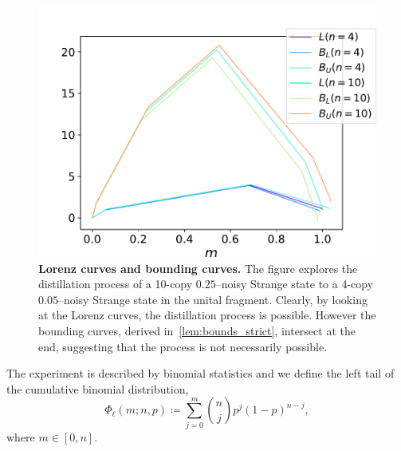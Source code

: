 \documentclass[pra,
aps,
twocolumn,
superscriptaddress,
groupedaddress,
nofootinbib,
reprint
]{revtex4-1}
\begin{document}
\begin{figure}[t]
    \centering
    \includegraphics[scale=0.4]{figs/lc_bounds.pdf}
    \caption{\textbf{Lorenz curves and bounding curves.} 
    The figure explores the distillation process of a 10-copy $0.25$--noisy Strange state to a 4-copy $0.05$--noisy Strange state in the unital fragment.
    Clearly, by looking at the Lorenz curves, the distillation process is possible.
    However the bounding curves, derived in~\cref{lem:bounds_strict}, intersect at the end, suggesting that the process is not necessarily possible.
    }
    \label{fig:lc_bounds}
\end{figure}

The experiment is described by binomial statistics and we define the left tail of the cumulative binomial distribution,
\begin{equation}\label{eq:phil}
	\Phi_\ell(m; n, p) \coloneqq \sum\limits_{j=0}^m \binom{n}{j} p^j (1-p)^{n-j},
\end{equation}
where $m\in [0,n]$. 
\end{document}
